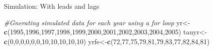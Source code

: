 \documentclass[
  ignorenonframetext,
]{beamer}
\newenvironment{Shaded}{\begin{snugshade}}{\end{snugshade}}
\newcommand{\CommentTok}[1]{\textcolor[rgb]{0.56,0.35,0.01}{\textit{#1}}}
\newcommand{\DecValTok}[1]{\textcolor[rgb]{0.00,0.00,0.81}{#1}}
\newcommand{\KeywordTok}[1]{\textcolor[rgb]{0.13,0.29,0.53}{\textbf{#1}}}
\newcommand{\NormalTok}[1]{#1}
\begin{document}
\begin{frame}[fragile]{Simulation: With leads and lags}
\protect\hypertarget{simulation-with-leads-and-lags-1}{}
\tiny

\begin{Shaded}
\begin{Highlighting}[]
\CommentTok{\#Gnerating simulated data for each year using a for loop}
\NormalTok{yr\textless{}{-}}\KeywordTok{c}\NormalTok{(}\DecValTok{1995}\NormalTok{,}\DecValTok{1996}\NormalTok{,}\DecValTok{1997}\NormalTok{,}\DecValTok{1998}\NormalTok{,}\DecValTok{1999}\NormalTok{,}\DecValTok{2000}\NormalTok{,}\DecValTok{2001}\NormalTok{,}\DecValTok{2002}\NormalTok{,}\DecValTok{2003}\NormalTok{,}\DecValTok{2004}\NormalTok{,}\DecValTok{2005}\NormalTok{)}
\NormalTok{tauyr\textless{}{-}}\KeywordTok{c}\NormalTok{(}\DecValTok{0}\NormalTok{,}\DecValTok{0}\NormalTok{,}\DecValTok{0}\NormalTok{,}\DecValTok{0}\NormalTok{,}\DecValTok{0}\NormalTok{,}\DecValTok{0}\NormalTok{,}\DecValTok{10}\NormalTok{,}\DecValTok{10}\NormalTok{,}\DecValTok{10}\NormalTok{,}\DecValTok{10}\NormalTok{,}\DecValTok{10}\NormalTok{)}
\NormalTok{yrfe\textless{}{-}}\KeywordTok{c}\NormalTok{(}\DecValTok{72}\NormalTok{,}\DecValTok{77}\NormalTok{,}\DecValTok{75}\NormalTok{,}\DecValTok{79}\NormalTok{,}\DecValTok{81}\NormalTok{,}\DecValTok{79}\NormalTok{,}\DecValTok{83}\NormalTok{,}\DecValTok{77}\NormalTok{,}\DecValTok{82}\NormalTok{,}\DecValTok{84}\NormalTok{,}\DecValTok{81}\NormalTok{)}


\end{Highlighting}
\end{Shaded}
\end{frame}
\end{document}

